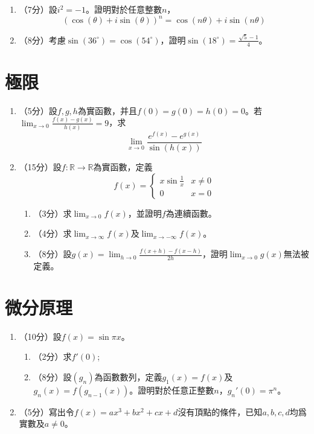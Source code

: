 \documentclass[12pt]{article}
\begin{document}
    \begin{enumerate}
        \item （7分）設$i^2=-1$。證明對於任意整數$n$，$$(\cos(\theta)+i\sin(\theta))^n=\cos(n\theta)+i\sin(n\theta)$$
        \item （8分）考慮$\sin(36^\circ)=\cos(54^\circ)$，證明$\sin(18^\circ)=\frac{\sqrt{5}-1}{4}$。
    \end{enumerate}

    \section*{極限}

    \begin{enumerate}
        \item （5分）設$f,g,h$為實函數，并且$f(0)=g(0)=h(0)=0$。若$\displaystyle \lim_{x\to 0}\frac{f(x)-g(x)}{h(x)}=9$，求$$\lim_{x\to 0}\frac{e^{f(x)}-e^{g(x)}}{\sin(h(x))}$$
        \item （15分）設$f:\mathbb{R}\to \mathbb{R}$為實函數，定義$$f(x)=\begin{cases}
            x\sin{\frac{1}{x}}&x\neq 0\\
            0&x=0
        \end{cases}$$\begin{enumerate}
            \item （3分）求$\displaystyle \lim_{x\to 0}f(x)$，並證明$f$為連續函數。
            \item （4分）求$\displaystyle \lim_{x\to \infty}f(x)$及$\displaystyle \lim_{x\to -\infty}f(x)$。
            \item （8分）設$\displaystyle g(x)=\lim_{h\to 0}\frac{f(x+h)-f(x-h)}{2h}$，證明$\lim_{x\to 0}g(x)$無法被定義。
        \end{enumerate}
    \end{enumerate}

    \section*{微分原理}

    \begin{enumerate}
        \item （10分）設$f(x)=\sin{\pi x}$。\begin{enumerate}
            \item （2分）求$f'(0)$;
            \item （8分）設$(g_n)$為函數數列，定義$g_1(x)=f(x)$及$g_n(x)=f(g_{n-1}(x))$。證明對於任意正整數$n$，$g_n'(0)=\pi^n$。
        \end{enumerate}
        \item （5分）寫出令$f(x)=ax^3+bx^2+cx+d$沒有頂點的條件，已知$a,b,c,d$均爲實數及$a\neq 0$。
    \end{enumerate}
\end{document}
